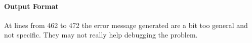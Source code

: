 


\paragraph{Output Format}
\begin{itemize}
		At lines from 462 to 472 the error message generated are a bit too general and not specific.
		They may not really help debugging the problem.
\end{itemize}

